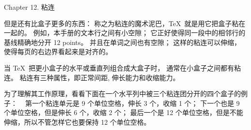 


\beginchapter Chapter 12. 粘连


\1但是还有比盒子更多的东西：
称之为{粘连}的魔术泥巴，\TeX\ 就是用它把盒子粘在一起\hbox{的。}%
例如，本手册的文本行之间有小空隙；
它正好使得同一段中的相邻行的基线精确地分开 12 points。%
并且在单词之间也有空隙；
这样的粘连可以伸缩，使得每页的右边界看起来是对齐的。

当 \TeX\ 把更小盒子的水平或垂直列组合成大盒子时，
通常在小盒子之间都有粘连。%
粘连有三种属性，即正常{间距}, {伸长}能力和{收缩}能力。

为了理解其工作原理，看看下面在一个水平列中被三个粘连团分开的四个盒子的例子：
\begindisplay\eightpoint
\vbox{
    \hbox{%
      }
    \kern6pt
    }
\enddisplay
第一个粘连单元是 9 个单位空格，伸长 3 个，收缩 1 个；
下一个也是 9 个单位空格，但是伸长 6 个，收缩 2 个；
最后一个是 12 个单位空格，但是不能伸缩，所以不管怎样它也要保持 12 个单位空格。

